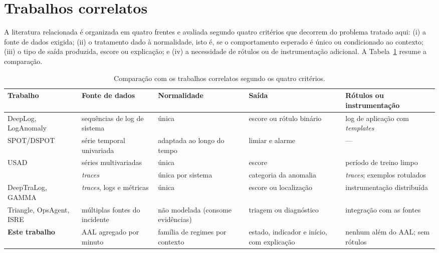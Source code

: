 \documentclass[sigconf,nonacm]{acmart}
\begin{document}
\section{Trabalhos correlatos}\label{sec:correlatos}

A literatura relacionada é organizada em quatro frentes e avaliada segundo quatro critérios que decorrem do problema tratado aqui: (i) a fonte de dados exigida; (ii) o tratamento dado à normalidade, isto é, se o comportamento esperado é único ou condicionado ao contexto; (iii) o tipo de saída produzida, escore ou explicação; e (iv) a necessidade de rótulos ou de instrumentação adicional. A Tabela~\ref{tab:correlatos} resume a comparação.

\begin{table}[t]
  \caption{Comparação com os trabalhos correlatos segundo os quatro critérios.}
  \label{tab:correlatos}
  \small
  \begin{tabular}{p{}p{}p{}p{}p{}}
    \toprule
    Trabalho & Fonte de dados & Normalidade & Saída & Rótulos ou instrumentação \\
    \midrule
    DeepLog, LogAnomaly & sequências de log de sistema & única & escore ou rótulo binário & log de aplicação com \emph{templates} \\
    SPOT/DSPOT & série temporal univariada & adaptada ao longo do tempo & limiar e alarme & --- \\
    USAD & séries multivariadas & única & escore & período de treino limpo \\
    \citet{wang2025crosssystem} & \emph{traces} & única por sistema & categoria da anomalia & \emph{traces}; exemplos rotulados \\
    DeepTraLog, GAMMA & \emph{traces}, logs e métricas & única & escore ou localização & instrumentação distribuída \\
    Triangle, OpsAgent, ISRE & múltiplas fontes do incidente & não modelada (consome evidências) & triagem ou diagnóstico & integração com as fontes \\
    \midrule
    \textbf{Este trabalho} & AAL agregado por minuto & família de regimes por contexto & estado, indicador e início, com explicação & nenhum além do AAL; sem rótulos \\
    \bottomrule
  \end{tabular}
\end{table}
\end{document}
